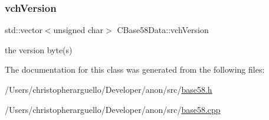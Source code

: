 \mbox{\label{class_c_base58_data_a110c1008f399053098a1bdf63408e923}} 
\subsubsection{\texorpdfstring{vch\+Version}{vchVersion}}
{\footnotesize\ttfamily std\+::vector$<$unsigned char$>$ C\+Base58\+Data\+::vch\+Version\hspace{0.3cm}{\ttfamily [protected]}}



the version byte(s) 



The documentation for this class was generated from the following files\+:\begin{DoxyCompactItemize}
\item 
/\+Users/christopherarguello/\+Developer/anon/src/\mbox{\hyperlink{base58_8h}{base58.\+h}}\item 
/\+Users/christopherarguello/\+Developer/anon/src/\mbox{\hyperlink{base58_8cpp}{base58.\+cpp}}\end{DoxyCompactItemize}
